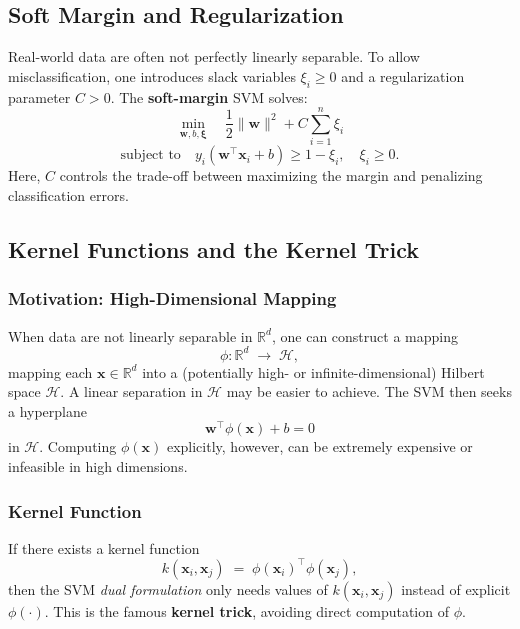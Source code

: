 \documentclass[11pt]{article}
\begin{document}
\subsection{Soft Margin and Regularization}

Real-world data are often not perfectly linearly separable. To allow misclassification, one introduces slack variables \(\xi_i \ge 0\) and a regularization parameter \(C>0\). The \textbf{soft-margin} SVM solves:
\[
\min_{\mathbf{w}, b, \boldsymbol{\xi}} 
\quad \frac{1}{2}\|\mathbf{w}\|^2 + C \sum_{i=1}^n \xi_i
\]
\[
\text{subject to} 
\quad y_i(\mathbf{w}^\top \mathbf{x}_i + b) \ge 1 - \xi_i, 
\quad \xi_i \ge 0.
\]
Here, \(C\) controls the trade-off between maximizing the margin and penalizing classification errors.

\subsection{Kernel Functions and the Kernel Trick}
\label{sec:kernel}

\subsubsection{Motivation: High-Dimensional Mapping}

When data are not linearly separable in \(\mathbb{R}^d\), one can construct a mapping
\[
\phi: \mathbb{R}^d \;\to\; \mathcal{H},
\]
mapping each \(\mathbf{x}\in\mathbb{R}^d\) into a (potentially high- or infinite-dimensional) Hilbert space \(\mathcal{H}\). A linear separation in \(\mathcal{H}\) may be easier to achieve. The SVM then seeks a hyperplane
\[
\mathbf{w}^\top \phi(\mathbf{x}) + b = 0
\]
in \(\mathcal{H}\). Computing \(\phi(\mathbf{x})\) explicitly, however, can be extremely expensive or infeasible in high dimensions.

\subsubsection{Kernel Function}

If there exists a kernel function
\[
k(\mathbf{x}_i, \mathbf{x}_j) \;=\; 
\phi(\mathbf{x}_i)^\top \phi(\mathbf{x}_j),
\]
then the SVM \textit{dual formulation} only needs values of \(k(\mathbf{x}_i, \mathbf{x}_j)\) instead of explicit \(\phi(\cdot)\). This is the famous \textbf{kernel trick}, avoiding direct computation of \(\phi\).
\end{document}
